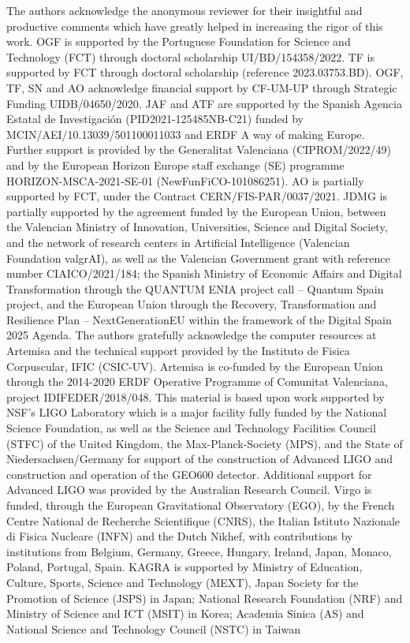 \documentclass[%
 reprint,
superscriptaddress,
nofootinbib,
 amsmath,amssymb,
 aps,
prd,
floatfix,
]{revtex4-2}
\begin{document}
\vspace{2cm}
\begin{acknowledgments}
The authors acknowledge the anonymous reviewer for their insightful and productive comments which have greatly helped in increasing the rigor of this work.
OGF is supported by the Portuguese Foundation for Science and Technology (FCT) through doctoral scholarship UI/BD/154358/2022.
TF is supported by FCT through doctoral scholarship (reference 2023.03753.BD).
OGF, TF, SN and AO acknowledge financial support by CF-UM-UP through Strategic Funding UIDB/04650/2020.
JAF and ATF are supported by the Spanish Agencia Estatal de Investigaci\'on (PID2021-125485NB-C21) funded by MCIN/AEI/10.13039/501100011033 and ERDF A way of making Europe. 
Further support is provided by the Generalitat Valenciana (CIPROM/2022/49) and  by  the  European Horizon  Europe  staff  exchange  (SE)  programme HORIZON-MSCA-2021-SE-01 (NewFunFiCO-101086251).
AO is partially supported by FCT, under the Contract CERN/FIS-PAR/0037/2021.
JDMG is partially supported by the agreement funded by the European Union, between the Valencian Ministry of
Innovation, Universities, Science and Digital Society, and the network of research centers in Artificial Intelligence
(Valencian Foundation valgrAI), as well as the Valencian Government grant with reference number CIAICO/2021/184; the Spanish Ministry of Economic Affairs and Digital Transformation through the QUANTUM ENIA project call – Quantum Spain project, and the European Union through the Recovery, Transformation and Resilience Plan – NextGenerationEU within the framework of the Digital Spain 2025 Agenda.
The authors gratefully acknowledge the computer resources at Artemisa and the technical support provided by the Instituto de Fisica Corpuscular, IFIC (CSIC-UV). Artemisa is co-funded by the European Union through the 2014-2020 ERDF Operative Programme of Comunitat Valenciana, project IDIFEDER/2018/048. This material is based upon work supported by NSF's LIGO Laboratory which is a major facility fully funded by the National Science Foundation, as well as the Science and Technology Facilities Council (STFC) of the United Kingdom, the Max-Planck-Society (MPS), and the State of Niedersachsen/Germany for support of the construction of Advanced LIGO and construction and operation of the GEO600 detector. Additional support for Advanced LIGO was provided by the Australian Research Council. Virgo is funded, through the European Gravitational Observatory (EGO), by the French Centre National de Recherche Scientifique (CNRS), the Italian Istituto Nazionale di Fisica Nucleare (INFN) and the Dutch Nikhef, with contributions by institutions from Belgium, Germany, Greece, Hungary, Ireland, Japan, Monaco, Poland, Portugal, Spain. KAGRA is supported by Ministry of Education, Culture, Sports, Science and Technology (MEXT), Japan Society for the Promotion of Science (JSPS) in Japan; National Research Foundation (NRF) and Ministry of Science and ICT (MSIT) in Korea; Academia Sinica (AS) and National Science and Technology Council (NSTC) in Taiwan 
\end{acknowledgments}




\end{document}
